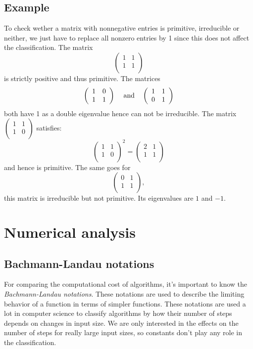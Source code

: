 \documentclass[a4paper,11pt]{report}
\begin{document}
   
   





\subsection{Example}
To check wether a matrix with nonnegative entries is primitive, irreducible or 
neither, we just have to replace all nonzero entries by 1 since this does not 
affect the classification. The matrix
$$\left(\begin{array}{cc}
1 & 1\\
1 & 1 \\
\end{array}\right)$$
is strictly positive and thus primitive. The matrices
$$\left(\begin{array}{cc}
1 & 0\\
1 & 1 \\
\end{array}\right) \text{\;\;\; and \;\;\,} 
\left(\begin{array}{cc}
1 & 1\\
0 & 1 \\
\end{array}\right)$$
both have 1 as a double eigenvalue hence can not be irreducible.
The matrix $\left(\begin{array}{cc}
1 & 1\\
1 & 0 \\
\end{array}\right)$ satisfies:
$$\left(\begin{array}{cc}
1 & 1\\
1 & 0 \\
\end{array}\right)^2 = \left(\begin{array}{cc}
2 & 1\\
1 & 1 \\
\end{array}\right)$$
and hence is primitive. The same goes for $$\left(\begin{array}{cc}
0 & 1\\
1 & 1 \\
\end{array}\right),$$ this matrix is irreducible but not primitive. Its 
eigenvalues are $1$ and $-1$.
\section{Numerical analysis}
\subsection{Bachmann-Landau notations}
For comparing the computational cost of algorithms, 
it's important to know the \emph{Bachmann-Landau notations}. These notations are used to describe the limiting behavior of a function in terms of simpler functions. 
These notations are used a lot in computer science to classify algorithms by how their number of steps depends on changes in input size. 
We are only interested in the effects on the number of steps for really large input sizes, so constants don't play any role in the classification.
\end{document}
